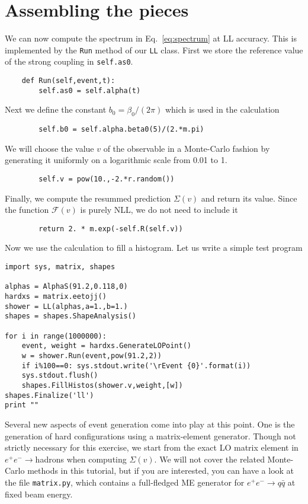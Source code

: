 \documentclass[10pt,fleqn]{scrartcl}
\begin{document}
\section{Assembling the pieces}
We can now compute the spectrum in Eq.~\eqref{eq:spectrum} at LL accuracy.
This is implemented by the {\tt Run} method of our {\tt LL} class.
First we store the reference value of the strong coupling in {\tt self.as0}.
\begin{verbatim}
    def Run(self,event,t):
        self.as0 = self.alpha(t)
\end{verbatim}
Next we define the constant $b_0=\beta_0/(2\pi)$ which is used in the calculation
\begin{verbatim}
        self.b0 = self.alpha.beta0(5)/(2.*m.pi)
\end{verbatim}
We will choose the value $v$ of the observable in a Monte-Carlo fashion
by generating it uniformly on a logarithmic scale from 0.01 to 1.
\begin{verbatim}
        self.v = pow(10.,-2.*r.random())
\end{verbatim}
Finally, we compute the resummed prediction $\Sigma(v)$ and return its value.
Since the function $\mathcal{F}(v)$ is purely NLL, we do not need to include it
\begin{verbatim}
        return 2. * m.exp(-self.R(self.v))

\end{verbatim}
\clearpage\noindent
Now we use the calculation to fill a histogram.
Let us write a simple test program
\begin{verbatim}
import sys, matrix, shapes

alphas = AlphaS(91.2,0.118,0)
hardxs = matrix.eetojj()
shower = LL(alphas,a=1.,b=1.)
shapes = shapes.ShapeAnalysis()

for i in range(1000000):
    event, weight = hardxs.GenerateLOPoint()
    w = shower.Run(event,pow(91.2,2))
    if i%100==0: sys.stdout.write('\rEvent {0}'.format(i))
    sys.stdout.flush()
    shapes.FillHistos(shower.v,weight,[w])
shapes.Finalize('ll')
print ""
\end{verbatim}
Several new aspects of event generation come into play at this point.
One is the generation of hard configurations using a matrix-element
generator. Though not strictly necessary for this exercise, we start
from the exact LO matrix element in $e^+e^-\to$hadrons when computing
$\Sigma(v)$. We will not cover the related Monte-Carlo methods in this
tutorial, but if you are interested, you can have a look at the file
{\tt matrix.py}, which contains a full-fledged ME generator for 
$e^+e^-\to q\bar{q}$ at fixed beam energy.
\end{document}
